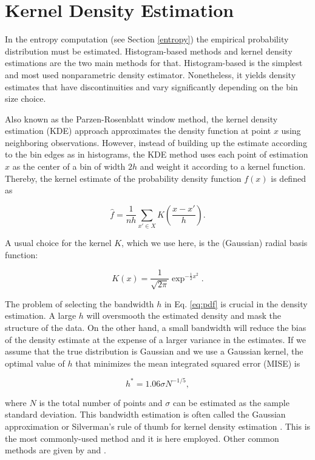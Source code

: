 \documentclass[]{book}
\theoremstyle{definition}
\theoremstyle{definition}
\theoremstyle{definition}
\theoremstyle{remark}
\begin{document}
\section{Kernel Density Estimation}\label{kde}

In the entropy computation (see Section \ref{entropy}) the empirical
probability distribution must be estimated. Histogram-based methods and
kernel density estimations are the two main methods for that.
Histogram-based is the simplest and most used nonparametric density
estimator. Nonetheless, it yields density estimates that have
discontinuities and vary significantly depending on the bin size choice.

Also known as the Parzen-Rosenblatt window method, the kernel density
estimation (KDE) approach approximates the density function at point
\(x\) using neighboring observations. However, instead of building up
the estimate according to the bin edges as in histograms, the KDE method
uses each point of estimation \(x\) as the center of a bin of width
\(2h\) and weight it according to a kernel function. Thereby, the kernel
estimate of the probability density function \(f(x)\) is defined as

\begin{equation}
\hat{f} = \frac{1}{nh}\sum_{x' \in X}{K\left(\frac{x - x'}{h}\right)}. 
\label{eq:pdf}
\end{equation}

A usual choice for the kernel \(K\), which we use here, is the
(Gaussian) radial basis function:

\begin{equation}
K(x) = \frac{1}{\sqrt{2\pi}}\exp^{-\frac{1}{2}x^2}. 
\end{equation}

The problem of selecting the bandwidth \(h\) in Eq. \eqref{eq:pdf} is
crucial in the density estimation. A large \(h\) will oversmooth the
estimated density and mask the structure of the data. On the other hand,
a small bandwidth will reduce the bias of the density estimate at the
expense of a larger variance in the estimates. If we assume that the
true distribution is Gaussian and we use a Gaussian kernel, the optimal
value of \(h\) that minimizes the mean integrated squared error (MISE)
is

\begin{equation*}
h^* = 1.06\sigma N^{-1/5},
\end{equation*}

where \(N\) is the total number of points and \(\sigma\) can be
estimated as the sample standard deviation. This bandwidth estimation is
often called the Gaussian approximation or Silverman's rule of thumb for
kernel density estimation \citep{silverman}. This is the most
commonly-used method and it is here employed. Other common methods are
given by \citep{sheather1991reliable} and \citep{scott1992multivariate}.
\end{document}
